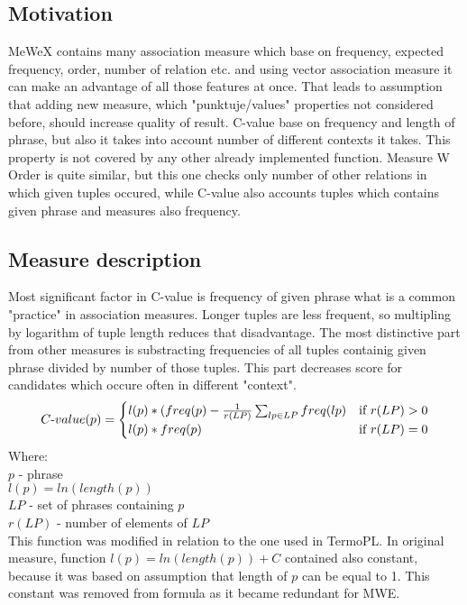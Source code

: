 \subsection{Motivation}
MeWeX contains many association measure which base on frequency, expected frequency, order, number of relation etc. 
and using vector association measure it can make an advantage of all those features at once. That leads to assumption that adding new measure, 
which "punktuje/values" properties not considered before, should increase quality of result. C-value base on frequency and length of phrase, 
but also it takes into account number of different contexts it takes. This property is not covered by any other already implemented function.
Measure W Order is quite similar, but this one checks only number of other relations in which given tuples occured, 
while C-value also accounts tuples which contains given phrase and measures also frequency.

\subsection{Measure description}
Most significant factor in C-value is frequency of given phrase what is a common "practice" in association measures. 
Longer tuples are less frequent, so multipling by logarithm of tuple length reduces that disadvantage. 
The most distinctive part from other measures is substracting frequencies of all tuples containig given phrase divided by number of those tuples. 
This part decreases score for candidates which occure often in different "context".
\[ 
    C{\text -}value(p) = \begin{cases}
        l(p) * (freq(p) - \frac{1}{r(LP)}\sum_{lp \in LP}{freq(lp)} & \text{if } r(LP) > 0\\
        l(p) * freq(p)            & \text{if } r(LP) = 0\\
    \end{cases}
\]
Where: \\
\(p\)  - phrase \\
\(l(p) = ln(length(p))\) \\
\(LP\)  - set of phrases containing \(p\) \\
\(r(LP)\) - number of elements of \(LP\) \\

This function was modified in relation to the one used in TermoPL. In original measure, function \(l(p) = ln(length(p)) + C\) 
contained also constant, because it was based on assumption that length of \(p\) can be equal to 1. This constant was removed 
from formula as it became redundant for MWE.


